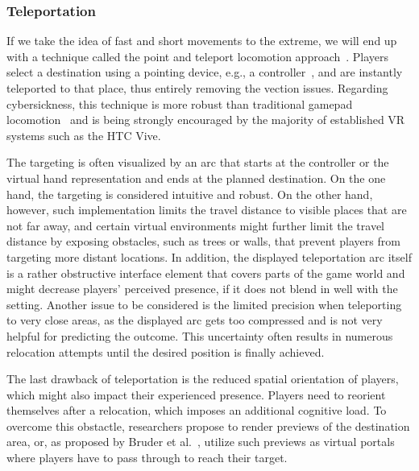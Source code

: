 


\subsubsection{Teleportation}

If we take the idea of fast and short movements to the extreme, we will end up with a technique called the point and teleport locomotion approach~\cite{bozgeyikli2016point}. Players select a destination using a pointing device, e.g., a controller~\cite{7892303}, and are instantly teleported to that place, thus entirely removing the vection issues. Regarding cybersickness, this technique is more robust than traditional gamepad locomotion~\cite{frommel2017effects} and is being strongly encouraged by the majority of established VR systems such as the HTC Vive.





The targeting is often visualized by an arc that starts at the controller or the virtual hand representation and ends at the planned destination. On the one hand, the targeting is considered intuitive and robust. On the other hand, however, such implementation limits the travel distance to visible places that are not far away, and certain virtual environments might further limit the travel distance by exposing obstacles, such as trees or walls, that prevent players from targeting more distant locations. 
In addition, the displayed teleportation arc itself is a rather obstructive interface element that covers parts of the game world and might decrease players' perceived presence, if it does not blend in well with the setting. 
Another issue to be considered is the limited precision when teleporting to very close areas, as the displayed arc gets too compressed and is not very helpful for predicting the outcome. This uncertainty often results in numerous relocation attempts until the desired position is finally achieved.

The last drawback of teleportation is the reduced spatial orientation of players, which might also impact their experienced presence. Players need to reorient themselves after a relocation, which imposes an additional cognitive load. To overcome this obstactle, researchers propose to render previews of the destination area, or, as proposed by Bruder et al.~\cite{bruder2009arch}, utilize such previews as virtual portals where players have to pass through to reach their target. 

